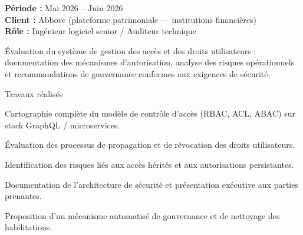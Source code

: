 \begin{cvgroup}

\begin{cvmetadata}
\textbf{Période :} Mai 2026 – Juin 2026 \\
\textbf{Client :} Abbove (plateforme patrimoniale — institutions financières) \\
\textbf{Rôle :} Ingénieur logiciel senior / Auditeur technique
\end{cvmetadata}

\begin{cvprojectsummary}
Évaluation du système de gestion des accès et des droits utilisateurs : documentation des mécanismes d'autorisation, analyse des risques opérationnels et recommandations de gouvernance conformes aux exigences de sécurité.
\end{cvprojectsummary}

\begin{cvdetailslist}{Travaux réalisés}
  \item {Cartographie complète du modèle de contrôle d'accès (RBAC, ACL, ABAC) sur stack GraphQL / microservices.}
  \item {Évaluation des processus de propagation et de révocation des droits utilisateurs.}
  \item {Identification des risques liés aux accès hérités et aux autorisations persistantes.}
  \item {Documentation de l'architecture de sécurité et présentation exécutive aux parties prenantes.}
  \item {Proposition d'un mécanisme automatisé de gouvernance et de nettoyage des habilitations.}
\end{cvdetailslist}



\end{cvgroup}
